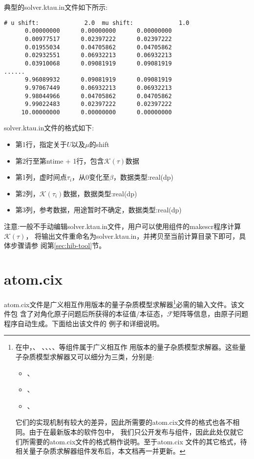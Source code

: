 典型的solver.ktau.in文件如下所示:
\begin{lstlisting}[frame=single]
# u shift:             2.0  mu shift:             1.0
      0.00000000      0.00000000      0.00000000
      0.00977517      0.02397222      0.02397222
      0.01955034      0.04705862      0.04705862
      0.02932551      0.06932213      0.06932213
      0.03910068      0.09081919      0.09081919
......
      9.96089932      0.09081919      0.09081919
      9.97067449      0.06932213      0.06932213
      9.98044966      0.04705862      0.04705862
      9.99022483      0.02397222      0.02397222
     10.00000000      0.00000000      0.00000000
\end{lstlisting}

solver.ktau.in文件的格式如下:
\begin{itemize}
\item 第1行，指定关于$U$以及$\mu$的shift
\item 第2行至第ntime + 1行，包含$\mathcal{K}(\tau)$数据
\item 第1列，虚时间点$\tau_{i}$，从0变化至$\beta$，数据类型:real(dp)
\item 第2列，$\mathcal{K}(\tau_i)$数据，数据类型:real(dp)
\item 第3列，参考数据，用途暂时不确定，数据类型:real(dp)
\end{itemize}

注意:一般不手动编辑solver.ktau.in文件，用户可以使用{\hibiscus}组件的makescr程序计算$\mathcal{K}(\tau)$，
将输出文件重命名为solver.ktau.in，并拷贝至当前计算目录下即可，具体步骤请参
阅第\ref{sec:hib-tool}节。

\section{atom.cix}
\label{sec:ac}

atom.cix文件是广义相互作用版本的量子杂质模型求解器\footnote{在{\iqist}中，{\begonia}、
{\lavender}、{\camellia}、{\epiphyllum}、{\pansy}、{\manjushaka}等组件属于广义相互作
用版本的量子杂质模型求解器。这些量子杂质模型求解器又可以细分为三类，分别是:
\begin{itemize}
\item {\begonia}、{\lavender}
\item {\camellia}、{\epiphyllum}
\item {\pansy}、{\manjushaka}
\end{itemize}
它们的实现机制有较大的差异，因此所需要的atom.cix文件的格式也各不相同。由于在最新版本的{\iqist}软件包中，
我们只公开发布{\begonia}与{\lavender}组件，因此此处仅就它们所需要的atom.cix文件的格式稍作说明。至于atom.cix
文件的其它格式，待相关量子杂质求解器组件发布后，本文档再一并更新。}必需的输入文件。该文件包
含了对角化原子问题后所获得的本征值/本征态，$\mathcal{F}$矩阵等信息，由原子问题程序自动生成。下面给出该文件的
例子和详细说明。

